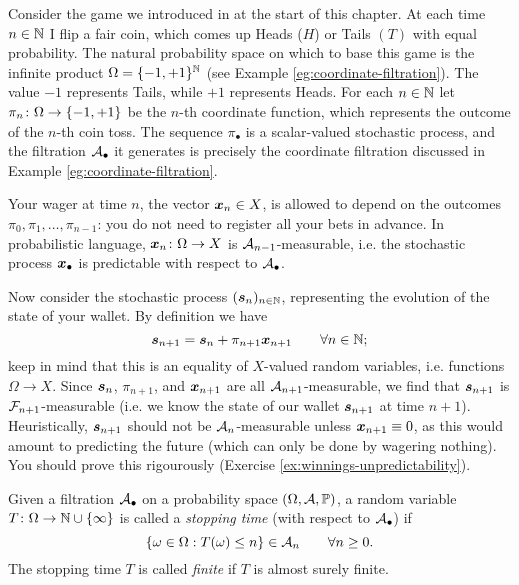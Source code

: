 \begin{example}\label{eg:gambling-filtrations}
  Consider the game we introduced in at the start of this chapter.
  At each time $n \in \mathbb{N}$ I flip a fair coin, which comes up Heads ($H$) or Tails $(T)$ with equal probability.
  The natural probability space on which to base this game is the infinite product $\Omega = \{-1,+1\}^{\mathbb{N}}$ (see Example \ref{eg:coordinate-filtration}).
  The value $-1$ represents Tails, while $+1$ represents Heads.
  For each $n \in \mathbb{N}$ let $\pi_n \colon \Omega \rightarrow \{-1,+1\}$ be the $n$-th coordinate function, which represents the outcome of the $n$-th coin toss.
  The sequence $\pi_{\bullet}$ is a scalar-valued stochastic process, and the filtration $\mathcal{A}_{\bullet}$ it generates is precisely the coordinate filtration discussed in Example \ref{eg:coordinate-filtration}.

  
  Your wager at time $n$, the vector $\bm{x}_n \in X$, is allowed to depend on the outcomes $\pi_0, \pi_1, \ldots, \pi_{n-1}$: you do not need to register all your bets in advance.
  In probabilistic language, $\bm{x}_n \colon \Omega \rightarrow X$ is $\mathcal{A}_{n-1}$-measurable, i.e. the stochastic process $\bm{x}_{\bullet}$ is predictable with respect to $\mathcal{A}_{\bullet}$.

  Now consider the stochastic process $(\bm{s}_n)_{n \in \mathbb{N}}$, representing the evolution of the state of your wallet.
  By definition we have
  \begin{equation*}
    \bm{s}_{n+1} = \bm{s}_n + \pi_{n+1} \bm{x}_{n+1} \qquad \forall n \in \mathbb{N};
  \end{equation*}
  keep in mind that this is an equality of $X$-valued random variables, i.e. functions $\Omega \to X$.
  Since $\bm{s}_n$, $\pi_{n+1}$, and $\bm{x}_{n+1}$ are all $\mathcal{A}_{n+1}$-measurable, we find that $\bm{s}_{n+1}$ is $\mathcal{F}_{n+1}$-measurable (i.e. we know the state of our wallet $\bm{s}_{n+1}$ at time $n+1$).
  Heuristically, $\bm{s}_{n+1}$ should not be $\mathcal{A}_n$-measurable unless $\bm{x}_{n+1} \equiv 0$, as this would amount to predicting the future (which can only be done by wagering nothing).
  You should prove this rigourously (Exercise \ref{ex:winnings-unpredictability}).
\end{example}

\begin{defn}
  Given a filtration $\mathcal{A}_\bullet$ on a probability space $(\Omega, \mathcal{A}, \mathbb{P})$, a random variable $T \colon \Omega \rightarrow \mathbb{N} \cup \{\infty\}$ is called a \emph{stopping time} (with respect to $\mathcal{A}_{\bullet}$) if 
  \begin{equation*}
    \{\omega \in \Omega: T(\omega) \leq n\} \in \mathcal{A}_n \qquad \forall n \geq 0.
  \end{equation*}
  The stopping time $T$ is called \emph{finite} if $T$ is almost surely finite.
\end{defn}

